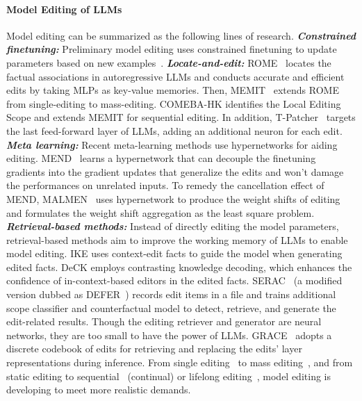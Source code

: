 \documentclass{article}
\begin{document}
\paragraph{Model Editing of LLMs} 
Model editing can be summarized as the following lines of research. 
\textbf{\textit{Constrained finetuning:}} Preliminary model editing uses constrained finetuning to update parameters based on new examples~\cite{constrained_ft_me_1,constrained_ft_me_2}. 
\textbf{\textit{Locate-and-edit:}} ROME~\cite{rome} locates the factual associations in autoregressive LLMs and conducts accurate and efficient edits by taking MLPs as key-value memories. 
Then, MEMIT~\cite{memit} extends ROME from single-editing to mass-editing.
COMEBA-HK \cite{comeba} identifies the Local Editing Scope and extends MEMIT for sequential editing.
In addition, T-Patcher~\cite{t-patcher} targets the last feed-forward layer of LLMs, adding an additional neuron for each edit. 
\textbf{\textit{Meta learning:}} Recent meta-learning methods use hypernetworks for aiding editing. MEND~\cite{mend} learns a hypernetwork that can decouple the finetuning gradients into the gradient updates that generalize the edits and won't damage the performances on unrelated inputs. To remedy the cancellation effect of MEND, MALMEN~\cite{malmen} uses hypernetwork to produce the weight shifts of editing and formulates the weight shift aggregation as the least square problem. 
\textbf{\textit{Retrieval-based methods:}} Instead of directly editing the model parameters, retrieval-based methods aim to improve the working memory of LLMs to enable model editing. IKE \cite{ike} uses context-edit facts to guide the model when generating edited facts. 
DeCK \cite{deck} employs contrasting knowledge decoding, which enhances the confidence of in-context-based editors in the edited facts. SERAC~\cite{serac} (a modified version dubbed as DEFER~\cite{grace}) records edit items in a file and trains additional scope classifier and counterfactual model to detect, retrieve, and generate the edit-related results. Though the editing retriever and generator are neural networks, they are too small to have the power of LLMs. GRACE~\cite{grace} adopts a discrete codebook of edits for retrieving and replacing the edits' layer representations during inference. From single editing~\cite{rome} to mass editing~\cite{malmen,memit}, and from static editing to sequential~\cite{t-patcher} (continual) or lifelong editing~\cite{grace}, model editing is developing to meet more realistic demands.
\end{document}
